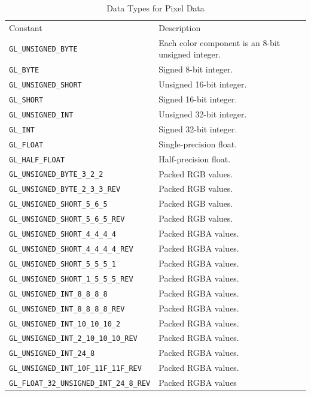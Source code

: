 \begin{table}[hbt]
  \begin{center}
    \caption{Data Types for Pixel Data}
    \begin{tabular}{lp{6cm}} 
      \hline
      Constant & Description \\
      \verb!GL_UNSIGNED_BYTE! & Each color component is an 8-bit unsigned
      integer. \\
      \verb!GL_BYTE! & Signed 8-bit integer. \\
      \verb!GL_UNSIGNED_SHORT! & Unsigned 16-bit integer. \\
      \verb!GL_SHORT! & Signed 16-bit integer. \\
      \verb!GL_UNSIGNED_INT!& Unsigned 32-bit integer.\\
      \verb!GL_INT! & Signed 32-bit integer.\\
      \verb!GL_FLOAT!& Single-precision float.\\
      \verb!GL_HALF_FLOAT! & Half-precision float. \\
      \verb!GL_UNSIGNED_BYTE_3_2_2! & Packed RGB values.\\
      \verb!GL_UNSIGNED_BYTE_2_3_3_REV! & Packed RGB values.\\
      \verb!GL_UNSIGNED_SHORT_5_6_5! &Packed RGB values. \\
      \verb!GL_UNSIGNED_SHORT_5_6_5_REV!& Packed RGB values.\\
      \verb!GL_UNSIGNED_SHORT_4_4_4_4! &Packed RGBA values. \\
      \verb!GL_UNSIGNED_SHORT_4_4_4_4_REV!& Packed RGBA values. \\
      \verb!GL_UNSIGNED_SHORT_5_5_5_1!& Packed RGBA values.\\
      \verb!GL_UNSIGNED_SHORT_1_5_5_5_REV! & Packed RGBA values. \\
      \verb!GL_UNSIGNED_INT_8_8_8_8! & Packed RGBA values.\\
      \verb!GL_UNSIGNED_INT_8_8_8_8_REV! & Packed RGBA values. \\
      \verb!GL_UNSIGNED_INT_10_10_10_2! & Packed RGBA values.\\
      \verb!GL_UNSIGNED_INT_2_10_10_10_REV! & Packed RGBA values. \\
      \verb!GL_UNSIGNED_INT_24_8! & Packed RGBA values.\\
      \verb!GL_UNSIGNED_INT_10F_11F_11F_REV! & Packed RGBA values. \\
      \verb!GL_FLOAT_32_UNSIGNED_INT_24_8_REV! & Packed RGBA values \\
      \hline\hline
    \end{tabular}
  \end{center}
  \label{tab:pixel_data_type}
\end{table}


